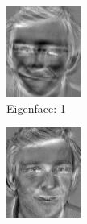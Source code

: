 \documentclass[12pt]{article}
\begin{document}
\begin{figure}
\begin{subfigure}[b]{0.20\textwidth}
		\includegraphics[width=\textwidth]{Task4.3_Images/PrincipalComponent1.jpg}
		\caption{Eigenface: 1}
	\end{subfigure}\quad
	\begin{subfigure}[b]{0.20\textwidth}
		\includegraphics[width=\textwidth]{Task4.3_Images/PrincipalComponent2.jpg}

\end{subfigure}
\end{figure}
\end{document}
